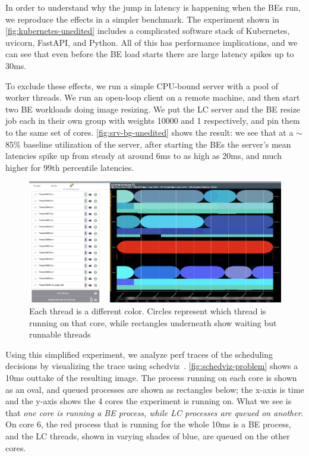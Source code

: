 In order to understand why the jump in latency is happening when the BEs run, we
reproduce the effects in a simpler benchmark. The experiment shown in
\autoref{fig:kubernetes-unedited} includes a complicated software stack of
Kubernetes, uvicorn, FastAPI, and Python. All of this has performance
implications, and we can see that even before the BE load starts there are large
latency spikes up to 30ms.

To exclude these effects, we run a simple CPU-bound server with a pool of worker
threads. We run an open-loop client on a remote machine, and then start two BE
workloads doing image resizing. We put the LC server and the BE resize job each
in their own \cgroups{} group with weights 10000 and 1 respectively, and pin
them to the same set of cores. \autoref{fig:srv-bg-unedited} shows the result:
we see that at a $\sim$85\% baseline utilization of the server, after starting
the BEs the server's mean latencies spike up from steady at around 6ms to as
high as 20ms, and much higher for 99th percentile latencies.

\begin{figure}[t]
    \centering
    \includegraphics[width=\columnwidth]{graphs/schedviz-problem.png}
    \caption{Each thread is a different color. Circles represent which
    thread is running on that core, while rectangles underneath show waiting but
    runnable threads
    }\label{fig:schedviz-problem}
\end{figure}

Using this simplified experiment, we analyze perf traces of the scheduling
decisions by visualizing the trace using schedviz~\cite{schedviz-tool}.
\autoref{fig:schedviz-problem} shows a 10ms outtake of the resulting image. The
process running on each core is shown as an oval, and queued processes are shown
as rectangles below; the x-axis is time and the y-axis shows the 4 cores the
experiment is running on. What we see is that \textit{one core is running a BE
process, while LC processes are queued on another}. On core 6, the red process
that is running for the whole 10ms is a BE process, and the LC threads, shown in
varying shades of blue, are queued on the other cores.

